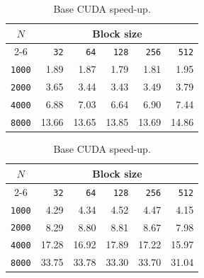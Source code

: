\documentclass[11pt]{article}
\begin{document}
\begin{table}[H]
    \centering
    \begin{minipage}{0.48\textwidth}
        \begin{table}[H]
            \centering
            \begin{tabular}{|c|r|r|r|r|r|} \hline
                \cellcolor{blue!10}\textbf{$N$} & \multicolumn{5}{c|}{\cellcolor{blue!10}\textbf{Block size}}
                \\ \cline{2-6}
                \cellcolor{blue!10} & \cellcolor{blue!20}\texttt{32} & \cellcolor{blue!20}\texttt{64} & \cellcolor{blue!20}\texttt{128} & \cellcolor{blue!20}\texttt{256} & \cellcolor{blue!20}\texttt{512} \\ \hline
                \texttt{1000} & 1.89 & 1.87 & \cellcolor{green!20}1.79 & 1.81 & \cellcolor{red!20}1.95 \\ \hline
                \texttt{2000} & 3.65 & 3.44 & \cellcolor{green!20}3.43 & 3.49 & \cellcolor{red!20}3.79 \\ \hline
                \texttt{4000} & 6.88 & 7.03 & \cellcolor{green!20}6.64 & 6.90 & \cellcolor{red!20}7.44 \\ \hline
                \texttt{8000} & 13.66 & \cellcolor{green!20}13.65 & 13.85 & 13.69 & \cellcolor{red!20}14.86 \\ \hline
            \end{tabular}
            \caption{Base CUDA absolute times (s).}
        \end{table}
    \end{minipage}
    \hfill
    \begin{minipage}{0.48\textwidth}
        \begin{table}[H]
            \centering
            \begin{tabular}{|c|r|r|r|r|r|} \hline
                \cellcolor{blue!10}\textbf{$N$} & \multicolumn{5}{c|}{\cellcolor{blue!10}\textbf{Block size}}
                \\ \cline{2-6}
                \cellcolor{blue!10} & \cellcolor{blue!20}\texttt{32} & \cellcolor{blue!20}\texttt{64} & \cellcolor{blue!20}\texttt{128} & \cellcolor{blue!20}\texttt{256} & \cellcolor{blue!20}\texttt{512} \\ \hline
                \texttt{1000} & 4.29 & 4.34 & \cellcolor{green!20}4.52 & 4.47 & \cellcolor{red!20}4.15 \\ \hline
                \texttt{2000} & 8.29 & 8.80 & \cellcolor{green!20}8.81 & 8.67 & \cellcolor{red!20}7.98 \\ \hline
                \texttt{4000} & 17.28 & 16.92 & \cellcolor{green!20}17.89 & 17.22 & \cellcolor{red!20}15.97 \\ \hline
                \texttt{8000} & 33.75 & \cellcolor{green!20}33.78 & 33.30 & 33.70 & \cellcolor{red!20}31.04 \\ \hline
            \end{tabular}
            \caption{Base CUDA speed-up.}
        \end{table}
    \end{minipage}
\end{table}
\end{document}
